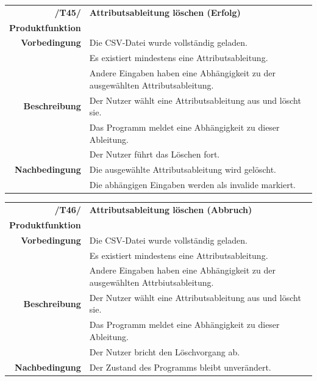 \documentclass{article}
\begin{document}
\begin{table}[H]
\begin{tabularx}{\textwidth}{rX}
 \vspace{1mm}
\textbf{/T45/}         & \textbf{Attributsableitung löschen (Erfolg)} \\ \vspace{1mm}
\textbf{Produktfunktion} & \nameref{sec:f:Attributsableitung löschen} \\
\textbf{Vorbedingung}  & Die CSV-Datei wurde vollständig geladen. \\ & Es existiert mindestens eine Attributsableitung.  \\ \vspace{1mm} & Andere Eingaben haben eine Abhängigkeit zu der ausgewählten Attributsableitung. \\
\textbf{Beschreibung}  & Der Nutzer wählt eine Attributsableitung aus und löscht sie. \\ & Das Programm meldet eine Abhängigkeit zu dieser Ableitung. \\ \vspace{1mm} & Der Nutzer führt das Löschen fort. \\
\textbf{Nachbedingung} & Die ausgewählte Attributsableitung wird gelöscht. \\ & Die abhängigen Eingaben werden als invalide markiert.
\end{tabularx}
\end{table}

\begin{table}[H]
\begin{tabularx}{\textwidth}{rX}
 \vspace{1mm}
\textbf{/T46/}         & \textbf{Attributsableitung löschen (Abbruch)} \\ \vspace{1mm}
\textbf{Produktfunktion} & \nameref{sec:f:Attributsableitung löschen} \\
\textbf{Vorbedingung}  & Die CSV-Datei wurde vollständig geladen. \\ & Es existiert mindestens eine Attributsableitung.  \\ \vspace{1mm} & Andere Eingaben haben eine Abhängigkeit zu der ausgewählten Attrbiutsableitung. \\
\textbf{Beschreibung}  & Der Nutzer wählt eine Attributsableitung aus und löscht sie. \\ & Das Programm meldet eine Abhängigkeit zu dieser Ableitung. \\ \vspace{1mm} & Der Nutzer bricht den Löschvorgang ab. \\
\textbf{Nachbedingung} & Der Zustand des Programms bleibt unverändert.
\end{tabularx}
\end{table}
\end{document}

